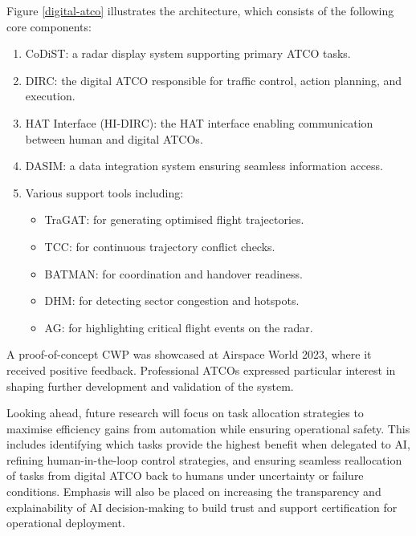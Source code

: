 Figure \ref{digital-atco} illustrates the architecture, which consists of the following core components:
\begin{enumerate}
    \item \gls{CoDiST}: a radar display system supporting primary \gls{ATCO} tasks.
    \item \gls{DIRC}: the digital \gls{ATCO} responsible for traffic control, action planning, and execution.
    \item \gls{HAT} Interface (HI-DIRC): the \gls{HAT} interface enabling communication between human and digital \glspl{ATCO}.
    \item \gls{DASIM}: a data integration system ensuring seamless information access.
    \item Various support tools including:
        \begin{itemize}
            \item \gls{TraGAT}: for generating optimised flight trajectories.
            \item \gls{TCC}: for continuous trajectory conflict checks.
            \item \gls{BATMAN}: for coordination and handover readiness.
            \item \gls{DHM}: for detecting sector congestion and hotspots.
            \item \gls{AG}: for highlighting critical flight events on the radar.
        \end{itemize}
\end{enumerate}

A proof-of-concept \gls{CWP} was showcased at Airspace World 2023, where it received positive feedback. 
Professional \glspl{ATCO} expressed particular interest in shaping further development and validation of the system.

Looking ahead, future research will focus on task allocation strategies to maximise efficiency gains from automation while ensuring operational safety. 
This includes identifying which tasks provide the highest benefit when delegated to \gls{AI}, refining human-in-the-loop control strategies, and ensuring seamless reallocation of tasks from digital \gls{ATCO} back to humans under uncertainty or failure conditions. 
Emphasis will also be placed on increasing the transparency and explainability of \gls{AI} decision-making to build trust and support certification for operational deployment.



